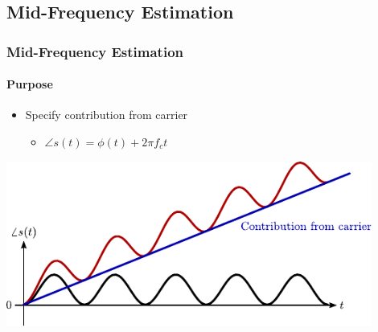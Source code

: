 \subsection{Mid-Frequency Estimation} \label{sec:midfreqest}

\begin{frame} \frametitle{Mid-Frequency Estimation}
    \framesubtitle{Purpose}
    \begin{itemize}
        \item Specify contribution from carrier
            \begin{itemize}
                \item $\angle s(t) = \phi (t) + 2 \pi f_c t$
            \end{itemize}
    \end{itemize}
    \begin{center}
        \includegraphics[width=0.9\textwidth]{img/phase_carrier}
    \end{center}
\end{frame}

